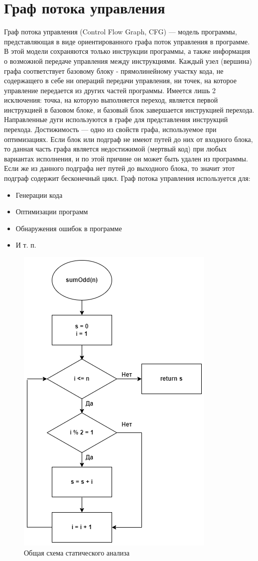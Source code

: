\section{Граф потока управления} \label{ch1:sec2-abbr2}
Граф потока управления (Control Flow Graph, CFG) — модель программы, представляющая в виде ориентированного графа поток управления в программе. В этой модели сохраняются только инструкции программы, а также информация о возможной передаче управления между инструкциями.
Каждый узел (вершина) графа соответствует базовому блоку - прямолинейному участку кода, не содержащего в себе ни операций передачи управления, ни точек, на которое управление передается из других частей программы. Имеется лишь 2 исключения: точка, на которую выполняется переход, является первой инструкцией в базовом блоке, и базовый блок завершается инструкцией перехода. Направленные дуги используются в графе для представления инструкций перехода. Достижимость — одно из свойств графа, используемое при оптимизациях. Если блок или подграф не имеют путей до них от входного блока, то данная часть графа является недостижимой (мертвый код) при любых вариантах исполнения, и по этой причине он может быть удален из программы. Если же из данного подграфа нет путей до выходного блока, то значит этот подграф содержит бесконечный цикл.
Граф потока управления используется для:
\begin{itemize}
\item Генерации кода 
\item Оптимизации программ 
\item Обнаружения ошибок в программе 
\item И т. п.
\end{itemize}
\begin{figure}[ht!] 
	\center
	\includegraphics [scale=1] {my_folder/images/my/3}
	\caption{Общая схема статического анализа } 
	\label{fig:3}  
\end{figure}
